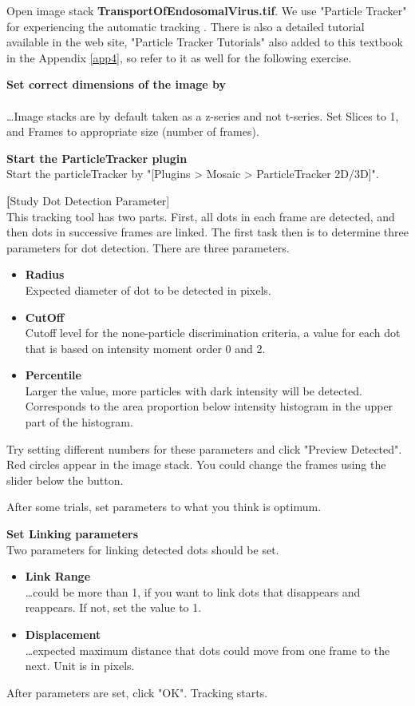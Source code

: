 \begin{indentexercise}{1}
Open image stack \textbf{TransportOfEndosomalVirus.tif}. 
We use "Particle Tracker" for experiencing the automatic tracking
\citep{Sbalzarini2005}. There is also a detailed tutorial available in the web
site, "Particle Tracker Tutorials" also added to this textbook in the
Appendix \ref{app4}, so refer to it as well for the following exercise. 

\textbf{Set correct dimensions of the image by}\\
\\
\dots Image stacks are by default taken as a z-series and not t-series. 
Set Slices to 1, and Frames to appropriate size (number of frames).

\textbf{Start the ParticleTracker plugin}\\
Start the particleTracker by \ijmenu"[Plugins > Mosaic > ParticleTracker
2D/3D]".

\textbf[Study Dot Detection Parameter]\hfill\\
This tracking tool has two parts. 
First, all dots in each frame are detected, and then dots in successive frames are linked. 
The first task then is to determine three parameters for dot detection. There are three parameters. 
\begin{itemize}
\item \textbf{Radius}\hfill\\
Expected diameter of dot to be detected in pixels. 
\item \textbf{CutOff}\hfill\\
Cutoff level for the none-particle discrimination criteria, 
a value for each dot that is based on intensity moment order 0 and 2. 
\item \textbf{Percentile}\hfill\\
Larger the value, more particles with dark intensity will be detected. 
Corresponds to the area proportion below intensity histogram in the upper part of the histogram. 
\end{itemize}
Try setting different numbers for these parameters and click "Preview Detected". 
Red circles appear in the image stack. You could change the frames using the slider below the button. 

After some trials, set parameters to what you think is optimum. 

\textbf{Set Linking parameters}\\

Two parameters for linking detected dots should be set. 
\begin{itemize}
\item \textbf{Link Range}\hfill\\
\dots could be more than 1, if you want to link dots that disappears and reappears. 
If not, set the value to 1.
\item \textbf{Displacement}\hfill\\
\dots expected maximum distance that dots could move from one frame to the next. 
Unit is in pixels. 
\end{itemize}
After parameters are set, click "OK". Tracking starts. 


\end{indentexercise}

